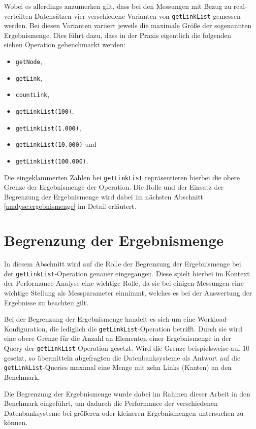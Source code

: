 Wobei es allerdings anzumerken gilt, dass bei den Messungen mit Bezug zu real-verteilten Datensätzen vier verschiedene Varianten von \texttt{getLinkList} gemessen werden. Bei diesen Varianten variiert jeweils die maximale Größe der sogenannten Ergebnismenge. Dies führt dazu, dass in der Praxis eigentlich die folgenden sieben Operation gebenchmarkt werden:
\begin{itemize}
    \item \texttt{getNode},
    \item \texttt{getLink},
    \item \texttt{countLink},
    \item \texttt{getLinkList(100)},
    \item \texttt{getLinkList(1.000)},
    \item \texttt{getLinkList(10.000)} und
    \item \texttt{getLinkList(100.000)}.
\end{itemize}
Die eingeklammerten Zahlen bei \texttt{getLinkList} repräsentieren hierbei die obere Grenze der Ergebnismenge der Operation. Die Rolle und der Einsatz der Begrenzung der Ergebnismenge wird dabei im nächsten Abschnitt \autoref{analyse:ergebnismenge} im Detail erläutert. 

\section{Begrenzung der Ergebnismenge}
\label{analyse:ergebnismenge}
In diesem Abschnitt wird auf die Rolle der Begrenzung der Ergebnismenge bei der \texttt{getLinkList}-Operation genauer eingegangen. Diese spielt hierbei im Kontext der Performance-Analyse eine wichtige Rolle, da sie bei einigen Messungen eine wichtige Stellung als Messparameter einnimmt, welches es bei der Auswertung der Ergebnisse zu beachten gilt. 

Bei der Begrenzung der Ergebnismenge handelt es sich um eine Workload-Konfiguration, die lediglich die \texttt{getLinkList}-Operation betrifft. Durch sie wird eine obere Grenze für die Anzahl an Elementen einer Ergebnismenge in der Query der \texttt{getLinkList}-Operation gesetzt. Wird die Grenze beispielsweise auf 10 gesetzt, so übermitteln abgefragten die Datenbanksysteme als Antwort auf die \texttt{getLinkList}-Queries maximal eine Menge mit zehn Links (Kanten) an den Benchmark. 

Die Begrenzung der Ergebnismenge wurde dabei im Rahmen dieser Arbeit in den Benchmark eingeführt, um dadurch die Performance der verschiedenen Datenbanksysteme bei größeren oder kleineren Ergebnismengen untersuchen zu können. 

